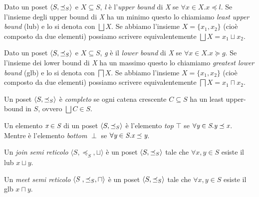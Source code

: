 \begin{definition}
Dato un poset \(\langle S, \preceq_{S}\rangle\) e \(X\subseteq S\), \emph{l} è l'\textit{upper bound} di \emph{X} se \(\forall x\in X. x\preceq l\). Se l'insieme degli upper bound di \emph{X} ha un minimo questo lo chiamiamo \textit{least upper bound} (lub) e lo si denota con \(\bigsqcup X\). Se abbiamo l'insieme \(X=\{x_1, x_2\}\) (cioè composto da due elementi) possiamo scrivere equivalentemente \(\bigsqcup X=x_1\sqcup x_2\).
\end{definition}

\begin{definition}
Dato un poset \(\langle S, \preceq_{S}\rangle\) e \(X\subseteq S\), \emph{g} è il \textit{lower bound} di \emph{X} se \(\forall x\in X. x\succeq g\). Se l'insieme dei lower bound di \emph{X} ha un massimo questo lo chiamiamo \textit{greatest lower bound} (glb) e lo si denota con \(\bigsqcap X\). Se abbiamo l'insieme \(X=\{x_1, x_2\}\) (cioè composto da due elementi) possiamo scrivere equivalentemente \(\bigsqcap X=x_1\sqcap x_2\).
\end{definition}

\begin{definition}
Un poset \(\langle S, \preceq_{S}\rangle\) è \textit{completo} se ogni catena crescente \(C\subseteq S\) ha un least upper-bound in \(S\), ovvero \(\bigsqcup C \in S\).
\end{definition}

\begin{definition} 
Un elemento \(\emph{x}\in\emph{S}\) di un poset \(\langle S, \preceq_{S}\rangle\) è l'elemento \textit{top} \(\top\) se \(\forall\emph{y}\in\emph{S}.\emph{y}\preceq\emph{x}\). Mentre è l'elemento \textit{bottom} \(\perp\) se \(\forall\emph{y}\in\emph{S}.\emph{x}\preceq\emph{y}\).
\end{definition}

\begin{definition}
Un \textit{join semi reticolo} \(\langle S,\preceq_S, \sqcup\rangle\) è un poset \(\langle S, \preceq_{S}\rangle\) tale che \(\forall x, y\in S\) esiste il lub \(x\sqcup y\).
\end{definition}

\begin{definition}
Un \textit{meet semi reticolo} \(\langle\emph{S },\preceq_S, \sqcap\rangle\) è un poset \(\langle S, \preceq_{S}\rangle\) tale che \(\forall x, y\in S\) esiste il glb \(x\sqcap y\).
\end{definition}

